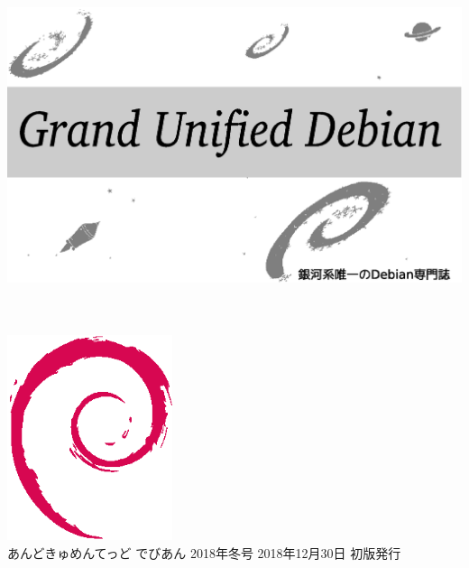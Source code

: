 \documentclass[mingoth,a4paper]{jsarticle}
\begin{document}
\begin{titlepage}
\thispagestyle{empty}

\hspace*{-2.5cm}
\includegraphics{image2012-natsu/gudeb.eps}\\
\\
\\

\hspace*{11cm}\includegraphics[height=6cm]{image200502/openlogo-nd.eps}\\
\vspace*{0.1cm}
\hfill あんどきゅめんてっど でびあん 2018年冬号 2018年12月30日 初版発行
\end{titlepage}

\newpage
\thispagestyle{empty}\mbox{}
\newpage
\end{document}
